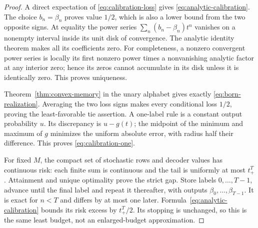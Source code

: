 \begin{proof}
A direct expectation of \eqref{eq:calibration-loss} gives \eqref{eq:analytic-calibration}. The choice $b_n=\beta_n$ proves value $1/2$, which is also a lower bound from the two opposite signs. At equality the power series $\sum_n(b_n-\beta_n)t^n$ vanishes on a nonempty interval inside its unit disk of convergence. The analytic identity theorem makes all its coefficients zero. For completeness, a nonzero convergent power series is locally its first nonzero power times a nonvanishing analytic factor at any interior zero; hence its zeros cannot accumulate in its disk unless it is identically zero. This proves uniqueness.

Theorem~\ref{thm:convex-memory} in the unary alphabet gives exactly \eqref{eq:born-realization}. Averaging the two loss signs makes every conditional loss $1/2$, proving the least-favorable tie assertion. A one-label rule is a constant output probability $u$. Its discrepancy is $u-g(t)$; the midpoint of the minimum and maximum of $g$ minimizes the uniform absolute error, with radius half their difference. This proves \eqref{eq:calibration-one}.

For fixed $M$, the compact set of stochastic rows and decoder values has continuous risk: each finite sum is continuous and the tail is uniformly at most $t_+^T$. Attainment and unique optimality prove the strict gap. Store labels $0,\ldots,T-1$, advance until the final label and repeat it thereafter, with outputs $\beta_0,\ldots,\beta_{T-1}$. It is exact for $n<T$ and differs by at most one later. Formula~\eqref{eq:analytic-calibration} bounds its risk excess by $t_+^T/2$. Its stopping is unchanged, so this is the same least budget, not an enlarged-budget approximation.
\end{proof}


